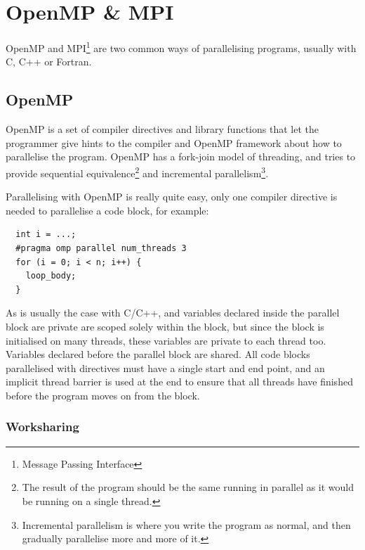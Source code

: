 
\section{OpenMP \& MPI}

OpenMP and MPI\footnote{Message Passing Interface} are two common ways
of parallelising programs, usually with C, C++ or Fortran.

\subsection{OpenMP}

OpenMP is a set of compiler directives and library functions that let
the programmer give hints to the compiler and OpenMP framework about
how to parallelise the program. OpenMP has a fork-join model of
threading, and tries to provide sequential equivalence\footnote{The
result of the program should be the same running in parallel as it
would be running on a single thread.} and incremental
parallelism\footnote{Incremental parallelism is where you write the
program as normal, and then gradually parallelise more and more of
it.}.

Parallelising with OpenMP is really quite easy, only one compiler
directive is needed to parallelise a code block, for example:

\begin{verbatim}
  int i = ...;
  #pragma omp parallel num_threads 3
  for (i = 0; i < n; i++) {
    loop_body;
  }
\end{verbatim}

As is usually the case with C/C++, and variables declared inside the
parallel block are private are scoped solely within the block, but
since the block is initialised on many threads, these variables are
private to each thread too. Variables declared before the parallel
block are shared. All code blocks parallelised with directives must
have a single start and end point, and an implicit thread barrier is
used at the end to ensure that all threads have finished before the
program moves on from the block.

\subsubsection{Worksharing}


